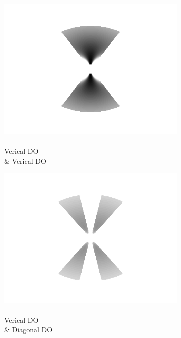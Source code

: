 \documentclass[journal,onecolumn]{IEEEtran}
\begin{document}
\begin{figure}[htbp!] \label{fig:bowtie-excite-maps}
    \centering
    \begin{subfigure}[b]{0.2\textwidth}
            \centering
            \captionsetup{justification=centering}
            \includegraphics[width=.85\linewidth]{map-j_1_1}
            \caption{\\ Verical DO \\ \& Verical DO}
    \end{subfigure}%
    \begin{subfigure}[b]{0.2\textwidth}
            \centering
            \captionsetup{justification=centering}
            \includegraphics[width=.85\linewidth]{map-j_1_2}
            \caption{\\ Verical DO \\ \& Diagonal DO}
    \end{subfigure}%
    \begin{subfigure}[b]{0.2\textwidth}

\end{subfigure}
\end{figure}
\end{document}
